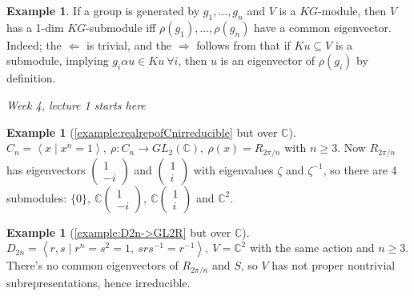 \documentclass{article}
\newcommand{\la}{\left\langle}
\newcommand{\ra}{\right\rangle}
\newcommand{\C}{\mathbb{C}}
\theoremstyle{definition}
\newtheorem{example}[defn]{Example}
\begin{document}
\begin{example}
If a group is generated by $g_1,\ldots,g_n$ and $V$ is a $KG$-module, then $V$ has a 1-dim $KG$-submodule iff $\rho(g_1),\ldots,\rho(g_n)$ have a common eigenvector. Indeed; the $\Leftarrow$ is trivial, and the $\Rightarrow$ follows from that if $Ku\subseteq V$ is a submodule, implying $g_i\alpha u\in Ku \ \forall i$, then $u$ is an eigenvector of $\rho(g_i)$ by definition.
\end{example}

\begin{flushright}
\textit{Week 4, lecture 1 starts here}
\end{flushright}

\begin{example}[\ref{example:realrepofCnirreducible} but over $\C$]
$C_n=\la x\mid x^n=1\ra,\ \rho:C_n\rightarrow GL_2(\C),\ \rho(x)=R_{2\pi/n}$ with $n\geq 3$. Now $R_{2\pi /n}$ has eigenvectors $\begin{pmatrix}1\\-i\end{pmatrix}$ and $\begin{pmatrix}1\\i\end{pmatrix}$ with eigenvalues $\zeta$ and $\zeta^{-1}$, so there are 4 submodules: $\{0\},\ \C\begin{pmatrix}1\\-i\end{pmatrix},\ \C\begin{pmatrix}1\\i\end{pmatrix}$ and $\C^2$.
\end{example}

\begin{example}[\ref{example:D2n->GL2R} but over $\C$]
$D_{2n}=\la r,s\mid r^n=s^2=1,\ srs^{-1}=r^{-1}\ra,\ V=\C^2$ with the same action and $n\geq 3$. There's no common eigenvectors of $R_{2\pi/n}$ and $S$, so $V$ has not proper nontrivial subrepresentations, hence irreducible.
\end{example}
\end{document}
